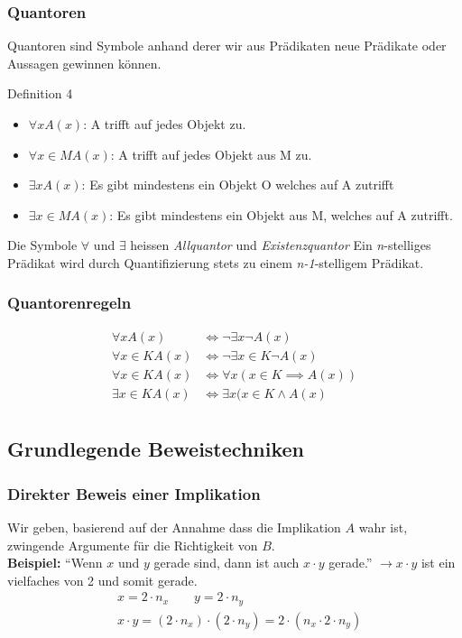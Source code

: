 	\subsubsection{Quantoren}
	Quantoren sind Symbole anhand derer wir aus Prädikaten 
	neue Prädikate oder Aussagen gewinnen können.
	\begin{definition}{Definition 4}
	\begin{itemize}
		\item $\forall xA (x)$: A trifft auf jedes Objekt zu.
		\item $\forall x \in M A(x)$: A trifft auf jedes Objekt aus M zu.
		\item $\exists x A(x)$: Es gibt mindestens ein Objekt O welches
		auf A zutrifft
		\item $\exists x \in M A(x)$: Es gibt mindestens ein Objekt
		aus M, welches auf A zutrifft.
	\end{itemize}
	Die Symbole $\forall$ und $\exists$ heissen \textit{Allquantor} und
	\textit{Existenzquantor}
	Ein \textit{n}-stelliges Prädikat wird durch Quantifizierung stets zu
	einem \textit{n-1}-stelligem Prädikat.
	\end{definition}
	\subsubsection{Quantorenregeln}
	\begin{align*}
		\forall x A(x) &\iff \neg\exists x \neg A(x) \\
		\forall x \in K A(x) &\iff \neg\exists x \in K \neg A(x) \\
		\forall x \in K A(x) &\iff \forall x(x\in K \implies A(x)) \\
		\exists x \in K A(x) &\iff \exists x (x \in K \land A(x) \\
	\end{align*}

	\subsection{Grundlegende Beweistechniken}
	
	\subsubsection{Direkter Beweis einer Implikation}
	Wir geben, basierend auf der Annahme dass die Implikation $A$ wahr ist, 
	zwingende Argumente für die Richtigkeit von $B$.\\
	\textbf{Beispiel:} ``Wenn $x$ und $y$ gerade sind, 
	dann ist auch $x \cdot y$ gerade.''
	$\rightarrow x \cdot y$ ist ein vielfaches von 2 und somit gerade.
	\begin{align*}
		&x = 2 \cdot n_x \qquad y = 2 \cdot n_y \\
		&x \cdot y = (2 \cdot n_x) \cdot (2 \cdot n_y) = 
		2 \cdot (n_x \cdot 2 \cdot n_y)
	\end{align*}
	
